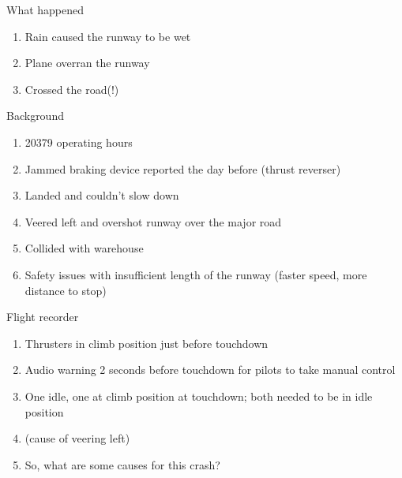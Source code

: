 \documentclass[aspectratio=1610,pdftex,dvipsnames,compress,xcolor={dvipsnames}]{beamer}
\begin{document}
\begin{frame}{What happened}
    \begin{enumerate}[series=outerlist,topsep=0pt,itemsep=21pt,leftmargin=*,label=(\arabic*)]
        \item[]Rain caused the runway to be wet
        \item[]Plane overran the runway
        \item[]Crossed the road(!)
    \end{enumerate}
\end{frame}


\begin{frame}{Background}
    \begin{enumerate}[series=outerlist,topsep=0pt,itemsep=17pt,leftmargin=*,label=(\arabic*)]
        \item[]20379 operating hours
        \item[]Jammed braking device reported the day before (thrust reverser)
        \item[]Landed and couldn't slow down
        \item[]Veered left and overshot runway over the major road
        \item[]Collided with warehouse
        \item[]Safety issues with insufficient length of the runway (faster speed, more distance to stop)
    \end{enumerate}
\end{frame}


\begin{frame}{Flight recorder}
    \begin{enumerate}[series=outerlist,topsep=0pt,itemsep=21pt,leftmargin=*,label=(\arabic*)]
        \item[]Thrusters in climb position just before touchdown
        \item[]Audio warning 2 seconds before touchdown for pilots to take manual control
        \item[]One idle, one at climb position at touchdown; both needed to be in idle position
        \item[](cause of veering left)
        \item[]So, what are some causes for this crash?
    \end{enumerate}
\end{frame}
\end{document}
